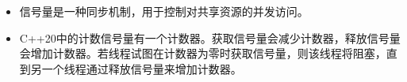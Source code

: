 \begin{tcolorbox}[breakable,enhanced jigsaw,colback=mygreen!5!white,colframe=mygreen!75!black,title={总结}]
	
\begin{itemize}
\item 
信号量是一种同步机制，用于控制对共享资源的并发访问。

\item 
C++20中的计数信号量有一个计数器。获取信号量会减少计数器，释放信号量会增加计数器。若线程试图在计数器为零时获取信号量，则该线程将阻塞，直到另一个线程通过释放信号量来增加计数器。
\end{itemize}
	
\end{tcolorbox}

\newpage
















